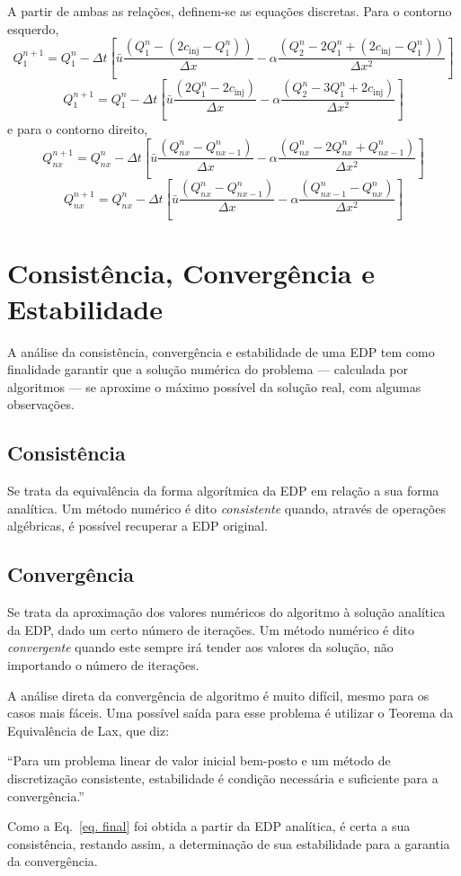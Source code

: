 A partir de ambas as relações, definem-se as equações discretas. Para o contorno
esquerdo,
\[
    Q_1^{n+1} = Q_1^n - \Delta t
    \left[
    \bar{u}\frac{(Q_1^n - (2c_{\text{inj}} - Q_1^n))}{\Delta x}
    -
    \alpha\frac{(Q_2^n - 2Q_1^n + (2c_{\text{inj}} - Q_1^n))}{\Delta x^2}
    \right]
\]
\begin{equation}
    Q_1^{n+1} = Q_1^n - \Delta t
    \left[
    \bar{u}\frac{(2Q_1^n - 2c_{\text{inj}})}{\Delta x}
    -
    \alpha\frac{(Q_2^n - 3Q_1^n + 2c_{\text{inj}})}{\Delta x^2}
    \right]
\end{equation}
e para o contorno direito,
\[
    Q_{nx}^{n+1} = Q_{nx}^n - \Delta t
    \left[
    \bar{u}\frac{(Q_{nx}^n - Q_{nx-1}^n)}{\Delta x}
    -
    \alpha\frac{(Q_{nx}^n - 2Q_{nx}^n + Q_{nx-1}^n)}{\Delta x^2}
    \right]
\]
\begin{equation}
    Q_{nx}^{n+1} = Q_{nx}^n - \Delta t
    \left[
    \bar{u}\frac{(Q_{nx}^n - Q_{nx-1}^n)}{\Delta x}
    -
    \alpha\frac{(Q_{nx-1}^n - Q_{nx}^n)}{\Delta x^2}
    \right]
\end{equation}

\section{Consistência, Convergência e Estabilidade}
A análise da consistência, convergência e estabilidade de uma EDP tem como
finalidade garantir que a solução numérica do problema --- calculada por
algoritmos --- se aproxime o máximo possível da solução real, com algumas
observações.

\subsection{Consistência}
Se trata da equivalência da forma algorítmica da EDP em relação a sua forma
analítica. Um método numérico é dito \emph{consistente} quando, através
de operações algébricas, é possível recuperar a EDP original.

\subsection{Convergência}
Se trata da aproximação dos valores numéricos do algoritmo à solução analítica
da EDP, dado um certo número de iterações. Um método numérico é dito
\emph{convergente} quando este sempre irá tender aos valores da solução, não
importando o número de iterações.

A análise direta da convergência de algoritmo é muito difícil, mesmo para os
casos mais fáceis. Uma possível saída para esse problema é utilizar o Teorema
da Equivalência de Lax, que diz:
\begin{displayquote}
    ``Para um problema linear de valor inicial bem-posto e um método de
    discretização consistente, estabilidade é condição necessária e suficiente
    para a convergência.''
\end{displayquote}
Como a Eq.\ \ref{eq. final} foi obtida a partir da EDP analítica, é certa a
sua consistência, restando assim, a determinação de sua estabilidade para a
garantia da convergência.

